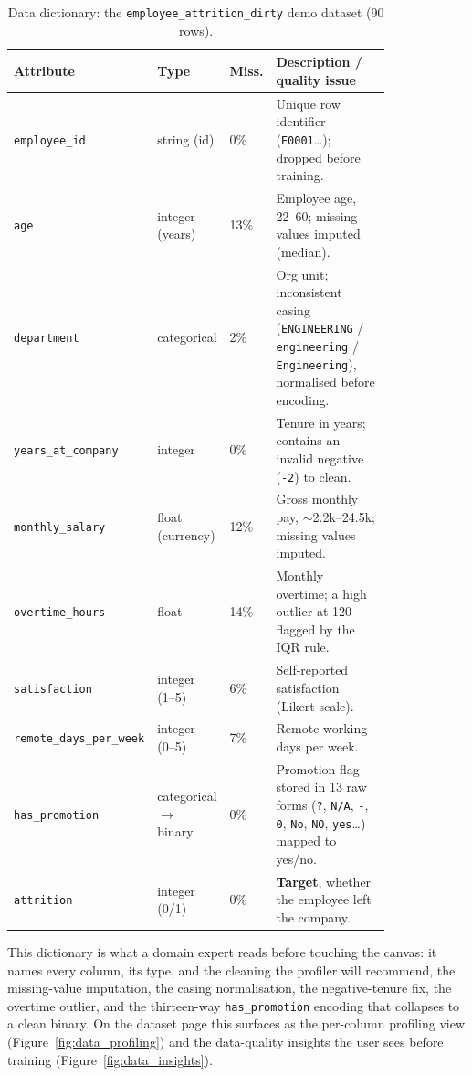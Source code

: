 \documentclass[12pt, a4paper, oneside]{report}
\begin{document}
\begin{table}[H]
\centering
\caption{Data dictionary: the \texttt{employee\_attrition\_dirty} demo dataset (90 rows).}
\label{tab:data_dictionary}
\footnotesize
\begin{tabular}{|p{0.27\linewidth}|p{0.13\linewidth}|p{0.06\linewidth}|L{0.36\linewidth}|}
\hline
\textbf{Attribute} & \textbf{Type} & \textbf{Miss.} & \textbf{Description / quality issue} \\
\hline
\texttt{employee\_id} & string (id) & 0\% & Unique row identifier (\texttt{E0001}\ldots); dropped before training. \\ \hline
\texttt{age} & integer (years) & 13\% & Employee age, 22--60; missing values imputed (median). \\ \hline
\texttt{department} & categorical & 2\% & Org unit; inconsistent casing (\texttt{ENGINEERING} / \texttt{engineering} / \texttt{Engineering}), normalised before encoding. \\ \hline
\texttt{years\_at\_company} & integer & 0\% & Tenure in years; contains an invalid negative (\texttt{-2}) to clean. \\ \hline
\texttt{monthly\_salary} & float (currency) & 12\% & Gross monthly pay, $\sim$2.2k--24.5k; missing values imputed. \\ \hline
\texttt{overtime\_hours} & float & 14\% & Monthly overtime; a high outlier at 120 flagged by the IQR rule. \\ \hline
\texttt{satisfaction} & integer (1--5) & 6\% & Self-reported satisfaction (Likert scale). \\ \hline
\texttt{remote\_days\_per\_week} & integer (0--5) & 7\% & Remote working days per week. \\ \hline
\texttt{has\_promotion} & categorical $\to$ binary & 0\% & Promotion flag stored in 13 raw forms (\texttt{?}, \texttt{N/A}, \texttt{-}, \texttt{0}, \texttt{No}, \texttt{NO}, \texttt{yes}\ldots) mapped to yes/no. \\ \hline
\texttt{attrition} & integer (0/1) & 0\% & \textbf{Target}, whether the employee left the company. \\
\hline
\end{tabular}
\end{table}

This dictionary is what a domain expert reads before touching the
canvas: it names every column, its type, and the cleaning the profiler
will recommend, the missing-value imputation, the casing
normalisation, the negative-tenure fix, the overtime outlier, and the
thirteen-way \texttt{has\_promotion} encoding that collapses to a clean
binary. On the dataset page this surfaces as the per-column profiling
view (Figure~\ref{fig:data_profiling}) and the data-quality insights the
user sees before training (Figure~\ref{fig:data_insights}).
\end{document}
